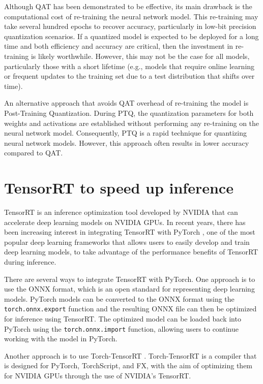 Although QAT has been demonstrated to be effective, its main drawback is the computational cost of re-training the neural network model. This re-training may take several hundred epochs to recover accuracy, particularly in low-bit precision quantization scenarios. If a quantized model is expected to be deployed for a long time and both efficiency and accuracy are critical, then the investment in re-training is likely worthwhile. However, this may not be the case for all models, particularly those with a short lifetime (e.g., models that require online learning or frequent updates to the training set due to a test distribution that shifts over time).

An alternative approach that avoids QAT overhead of re-training the model is Post-Training Quantization. During PTQ, the quantization parameters for both weights and activations are established without performing any re-training on the neural network model. Consequently, PTQ is a rapid technique for quantizing neural network models. However, this approach often results in lower accuracy compared to QAT.

\section{TensorRT to speed up inference}
\label{sec:tensorrt}

TensorRT is an inference optimization tool developed by NVIDIA that can accelerate deep learning models on NVIDIA GPUs. In recent years, there has been increasing interest in integrating TensorRT with PyTorch \cite{NEURIPS2019_9015}, one of the most popular deep learning frameworks that allows users to easily develop and train deep learning models, to take advantage of the performance benefits of TensorRT during inference.
 
There are several ways to integrate TensorRT with PyTorch. One approach is to use the ONNX \cite{bai2019} format, which is an open standard for representing deep learning models. PyTorch models can be converted to the ONNX format using the \texttt{torch.onnx.export} function and the resulting ONNX file can then be optimized for inference using TensorRT. The optimized model can be loaded back into PyTorch using the \texttt{torch.onnx.import} function, allowing users to continue working with the model in PyTorch.

Another approach is to use Torch-TensorRT \cite{torchtensorrt}. Torch-TensorRT is a compiler that is designed for PyTorch, TorchScript, and FX, with the aim of optimizing them for NVIDIA GPUs through the use of NVIDIA's TensorRT.

